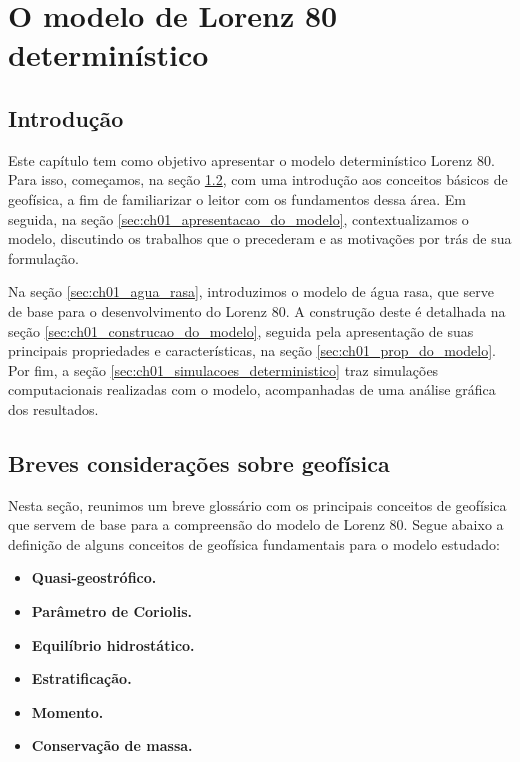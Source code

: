 \chapter{O modelo de Lorenz 80 determinístico} \label{cap:ch01_lorenz_deterministico}

\section{Introdução} \label{sec:ch01_introducao}
Este capítulo tem como objetivo apresentar o modelo determinístico Lorenz 80. Para isso, começamos, na seção \ref{sec:ch01_geofisica}, com uma introdução aos conceitos básicos de geofísica, a fim de familiarizar o leitor com os fundamentos dessa área. Em seguida, na seção \ref{sec:ch01_apresentacao_do_modelo}, contextualizamos o modelo, discutindo os trabalhos que o precederam e as motivações por trás de sua formulação.

Na seção \ref{sec:ch01_agua_rasa}, introduzimos o modelo de água rasa, que serve de base para o desenvolvimento do Lorenz 80. A construção deste é detalhada na seção \ref{sec:ch01_construcao_do_modelo}, seguida pela apresentação de suas principais propriedades e características, na seção \ref{sec:ch01_prop_do_modelo}. Por fim, a seção \ref{sec:ch01_simulacoes_deterministico} traz simulações computacionais realizadas com o modelo, acompanhadas de uma análise gráfica dos resultados.

\section{Breves considerações sobre geofísica} \label{sec:ch01_geofisica}

Nesta seção, reunimos um breve glossário com os principais conceitos de geofísica que servem de base para a compreensão do modelo de Lorenz 80. Segue abaixo a definição de alguns conceitos de geofísica fundamentais para o modelo estudado:
\begin{itemize}
    \item \textbf{Quasi-geostrófico.}
    \item \textbf{Parâmetro de Coriolis.}
    \item \textbf{Equilíbrio hidrostático.}
    \item \textbf{Estratificação.}
    \item \textbf{Momento.}
    \item \textbf{Conservação de massa.}
\end{itemize}

